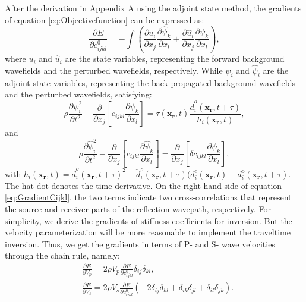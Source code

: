 \documentclass[extra,mreferee]{gji}
\begin{document}
After the derivation in Appendix A using the adjoint state method, the gradients of equation \eqref{eq:Objectivefunction} can be expressed as:
\begin{equation}
	\frac{\partial E}{\partial c^0_{ijkl}}=-\int (\frac{\partial u_{i}}{\partial
	x_j}\frac{\partial \hat{\psi}_{k}}{\partial x_l}+\frac{\partial \hat{u}_{i}}{\partial
	x_j}\frac{\partial \psi_{k}}{\partial x_l}),
    \label{eq:GradientCijkl}
\end{equation}
where $u_i$ and $\hat{u}_i$ are the state variables, representing the forward
background wavefields and the perturbed wavefields, respectively. While $\psi_i$ and $\hat{
\psi}_i$ are the adjoint state variables, representing the back-propagated background
wavefields and the perturbed wavefields, satisfying:
\begin{equation}
    \rho \frac{\partial \psi^2_i}{\partial t^2}  -
    \frac{\partial}{\partial x_j}\left[ 
        c_{ijkl}\frac{\partial \psi_{k}}{\partial
		x_l}\right]=\tau(\mathbf{x_r},t)\frac{\dot{d}^o_i(\mathbf{x_r},t+\tau)}{h_i(\mathbf{x_r},t)},
    \label{eq:AdjointWE} 
\end{equation}
and
\begin{equation}
    \rho \frac{\partial \hat \psi^2_i}{\partial t^2}  -
    \frac{\partial}{\partial x_j}\left[ 
        c_{ijkl}\frac{\partial \hat\psi_{k}}{\partial
        x_l}\right]=\frac{\partial}{\partial x_j}\left[\delta c_{ijkl}\frac{\partial
		\psi_{k}}{\partial x_l}\right],
    \label{eq:AdjointDeltaWE} 
\end{equation}
with
$h_i(\mathbf{x_r},t)=\dot{d}^o_i(\mathbf{x_r},t+\tau)^2-\ddot{d}^o_i(\mathbf{x_r},t+\tau)(d^c_i(\mathbf{x_r},t)-d^o_i(\mathbf{x_r},t+\tau)$.
The hat dot denotes the time derivative. On the right hand side of equation
\eqref{eq:GradientCijkl}, the two terms indicate two cross-correlations that represent the source and receiver
parts of the reflection wavepath, respectively. For simplicity, we derive the
gradients of stiffness
coefficients for inversion. But the velocity parameterization will be more reasonable
to implement the traveltime inversion.
Thus, we get the gradients in terms of P- and S- wave velocities through the chain rule, namely:
\begin{equation}
	\begin{split}
	&\frac{\partial E}{\partial V_p}=2\rho V_p\frac{\partial E}{\partial
		c^0_{ijkl}}\delta_{ij}\delta_{kl}, \\
	&\frac{\partial E}{\partial V_s}=2\rho V_s\frac{\partial
	E}{\partial c^0_{ijkl}}(-2\delta_{ij}\delta_{kl}+\delta_{ik}\delta_{jl}+
	\delta_{il}\delta_{jk}).
	\end{split}
    \label{eq:GradientVel}
\end{equation}
\end{document}
